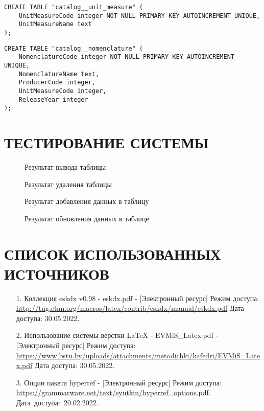 \documentclass[12pt, a4paper, simple]{eskdtext}
\begin{document}
\begin{lstlisting}[name=Справочник "Единицы хранения"]
CREATE TABLE "catalog__unit_measure" (
    UnitMeasureCode integer NOT NULL PRIMARY KEY AUTOINCREMENT UNIQUE,
    UnitMeasureName text
);
\end{lstlisting}

\begin{lstlisting}[name=Справочник "Номенклатура"]
CREATE TABLE "catalog__nomenclature" (
    NomenclatureCode integer NOT NULL PRIMARY KEY AUTOINCREMENT UNIQUE,
    NomenclatureName text,
    ProducerCode integer,
    UnitMeasureCode integer,
    ReleaseYear integer
);
\end{lstlisting}

\newpage
\section{ТЕСТИРОВАНИЕ СИСТЕМЫ}

\begin{figure}[!h]
    \centering
    \caption{Результат вывода таблицы}
\end{figure}

\begin{figure}[!h]
    \centering
    \caption{Результат удаления таблицы}
\end{figure}

\begin{figure}[!h]
    \centering
    \caption{Результат добавления данных в таблицу}
\end{figure}

\begin{figure}[!h]
    \centering
    \caption{Результат обновления данных в таблице}
\end{figure}


\newpage
{}
\section*{СПИСОК ИСПОЛЬЗОВАННЫХ ИСТОЧНИКОВ}
\begin{enumerate}
    \item[1.] Коллекция eskdx v0.98 - eskdx.pdf
    - [Электронный ресурс]
    Режим доступа: \url{http://tug.ctan.org/macros/latex/contrib/eskdx/manual/eskdx.pdf}
    Дата доступа: 30.05.2022.

    \item[2.] Использование системы верстки LaTeX - EVMiS\_Latex.pdf
    - [Электронный ресурс]
    Режим доступа: \url{https://www.bstu.by/uploads/attachments/metodichki/kafedri/EVMiS_Latex.pdf}
    Дата доступа: 30.05.2022.

    \item[3.] Опции пакета hyperref
    - [Электронный ресурс]
    Режим доступа: \url{https://grammarware.net/text/syutkin/hyperref_options.pdf}.
    Дата~доступа:~20.02.2022.
\end{enumerate}


\newpage
\end{document}
